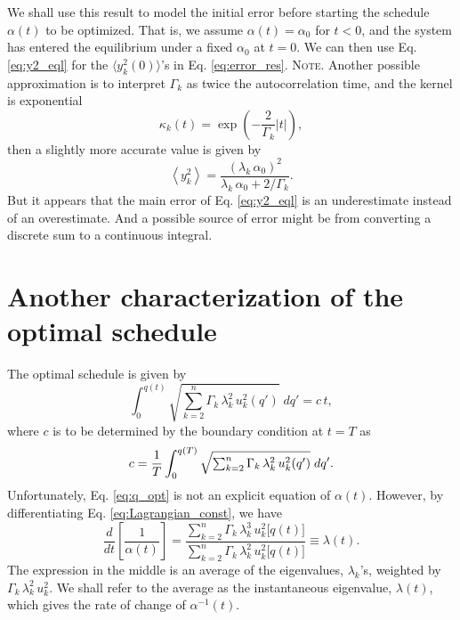 \documentclass[reprint, floatfix]{revtex4-1}
\newcommand{\note}[1]{{\color{DarkGreen}\footnotesize \textsc{Note.} #1}}
\begin{document}
We shall use this result to model the initial error
before starting the schedule $\alpha(t)$ to be optimized.
%
That is, we assume
$\alpha(t) = \alpha_0$
for $t < 0$, and
the system has entered the equilibrium
under a fixed $\alpha_0$ at $t = 0$.
%
We can then use Eq. \eqref{eq:y2_eql}
for the $\langle y_k^2(0) \rangle$'s in Eq. \eqref{eq:error_res}.
%
\note{Another possible approximation
  is to interpret $\Gamma_k$ as twice the autocorrelation time,
  and the kernel is exponential
  $$
  \kappa_k(t) = \exp\left( - \frac{2}{\Gamma_k} |t| \right),
  $$
  then a slightly more accurate value is given by\cite{vankampen}
  $$
  \left\langle
    y_k^2
  \right\rangle
  =
  \frac{      ( \lambda_k \, \alpha_0 )^2     }
       { \lambda_k \, \alpha_0 + 2 / \Gamma_k }.
  $$
  But it appears that the main error of Eq. \eqref{eq:y2_eql}
  is an underestimate instead of an overestimate.
  And a possible source of error might be from
  converting a discrete sum to a continuous integral.
}



\section{
Another characterization of the optimal schedule}


The optimal schedule is given by
\begin{equation}
  \int_{ 0 }^{ q(t) }
    \sqrt{
      \textstyle\sum_{ k = 2 }^n
        \Gamma_k \, \lambda_k^2
        \, u_k^2( q' )
    }
    \;
    d q'
  =
  c \, t
  ,
  \label{eq:q_opt}
\end{equation}
%
where $c$ is to be determined by
the boundary condition at $t = T$ as
%
\begin{equation}
  c =
  \frac 1 T
  \int_{ 0 }^{ q(T) }
    \sqrt{
      \textstyle\sum_{ k = 2 }^n
        \Gamma_k \, \lambda_k^2
        \, u_k^2( q' )
    }
    \;
    d q'
  .
  \notag
\end{equation}
%
Unfortunately,
Eq. \eqref{eq:q_opt} is not an explicit equation of $\alpha(t)$.
%
However,
by differentiating Eq. \eqref{eq:Lagrangian_const},
we have
%
\begin{equation}
  \frac{ d   }
       { d t }
  \left[
    \frac{       1     }
         { \alpha( t ) }
  \right]
  =
  \frac{
    \sum_{ k = 2 }^n
      \Gamma_k \, \lambda_k^3
      \, u_k^2 \bigl[ q(t) \bigr]
  }
  {
    \sum_{ k = 2 }^n
      \Gamma_k \, \lambda_k^2
      \, u_k^2 \bigl[ q(t) \bigr]
  }
  \equiv
  \lambda(t)
  .
  \label{eq:dinvadt}
\end{equation}
%
The expression in the middle is an average
of the eigenvalues, $\lambda_k$'s,
weighted by $\Gamma_k \, \lambda_k^2 \, u_k^2$.
%
We shall refer to the average as the instantaneous
eigenvalue, $\lambda(t)$,
which gives the rate of change of $\alpha^{-1}(t)$.
\end{document}
